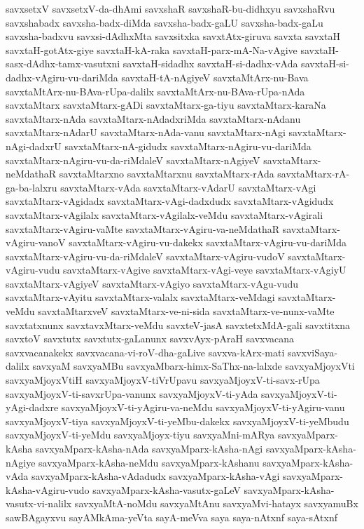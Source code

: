 {savxsetxV
savxsetxV-da-dhAmi
savxshaR
savxshaR-bu-didhxyu
savxshaRvu
savxshabadx
savxsha-badx-diMda
savxsha-badx-gaLU
savxsha-badx-gaLu
savxsha-badxvu
savxsi-dAdhxMta
savxsitxka
savxtAtx-giruva
savxta
savxtaH
savxtaH-gotAtx-giye
savxtaH-kA-raka
savxtaH-parx-mA-Na-vAgive
savxtaH-sasx-dAdhx-tamx-vasutxni
savxtaH-sidadhx
savxtaH-si-dadhx-vAda
savxtaH-si-dadhx-vAgiru-vu-dariMda
savxtaH-tA-nAgiyeV
savxtaMtArx-nu-Bava
savxtaMtArx-nu-BAva-rUpa-dalilx
savxtaMtArx-nu-BAva-rUpa-nAda
savxtaMtarx
savxtaMtarx-gADi
savxtaMtarx-ga-tiyu
savxtaMtarx-karaNa
savxtaMtarx-nAda
savxtaMtarx-nAdadxriMda
savxtaMtarx-nAdanu
savxtaMtarx-nAdarU
savxtaMtarx-nAda-vanu
savxtaMtarx-nAgi
savxtaMtarx-nAgi-dadxrU
savxtaMtarx-nA-gidudx
savxtaMtarx-nAgiru-vu-dariMda
savxtaMtarx-nAgiru-vu-da-riMdaleV
savxtaMtarx-nAgiyeV
savxtaMtarx-neMdathaR
savxtaMtarxno
savxtaMtarxnu
savxtaMtarx-rAda
savxtaMtarx-rA-ga-ba-lalxru
savxtaMtarx-vAda
savxtaMtarx-vAdarU
savxtaMtarx-vAgi
savxtaMtarx-vAgidadx
savxtaMtarx-vAgi-dadxdudx
savxtaMtarx-vAgidudx
savxtaMtarx-vAgilalx
savxtaMtarx-vAgilalx-veMdu
savxtaMtarx-vAgirali
savxtaMtarx-vAgiru-vaMte
savxtaMtarx-vAgiru-va-neMdathaR
savxtaMtarx-vAgiru-vanoV
savxtaMtarx-vAgiru-vu-dakekx
savxtaMtarx-vAgiru-vu-dariMda
savxtaMtarx-vAgiru-vu-da-riMdaleV
savxtaMtarx-vAgiru-vudoV
savxtaMtarx-vAgiru-vudu
savxtaMtarx-vAgive
savxtaMtarx-vAgi-veye
savxtaMtarx-vAgiyU
savxtaMtarx-vAgiyeV
savxtaMtarx-vAgiyo
savxtaMtarx-vAgu-vudu
savxtaMtarx-vAyitu
savxtaMtarx-valalx
savxtaMtarx-veMdagi
savxtaMtarx-veMdu
savxtaMtarxveV
savxtaMtarx-ve-ni-sida
savxtaMtarx-ve-nunx-vaMte
savxtatxnunx
savxtavxMtarx-veMdu
savxteV-jasA
savxtetxMdA-gali
savxtitxna
savxtoV
savxtutx
savxtutx-gaLanunx
savxvAyx-pAraH
savxvacana
savxvacanakekx
savxvacana-vi-roV-dha-gaLive
savxva-kArx-mati
savxviSaya-dalilx
savxyaM
savxyaMBu
savxyaMbarx-himx-SaThx-na-lalxde
savxyaMjoyxVti
savxyaMjoyxVtiH
savxyaMjoyxV-tiVrUpavu
savxyaMjoyxV-ti-savx-rUpa
savxyaMjoyxV-ti-savxrUpa-vanunx
savxyaMjoyxV-ti-yAda
savxyaMjoyxV-ti-yAgi-dadxre
savxyaMjoyxV-ti-yAgiru-va-neMdu
savxyaMjoyxV-ti-yAgiru-vanu
savxyaMjoyxV-tiya
savxyaMjoyxV-ti-yeMbu-dakekx
savxyaMjoyxV-ti-yeMbudu
savxyaMjoyxV-ti-yeMdu
savxyaMjoyx-tiyu
savxyaMni-mARya
savxyaMparx-kAsha
savxyaMparx-kAsha-nAda
savxyaMparx-kAsha-nAgi
savxyaMparx-kAsha-nAgiye
savxyaMparx-kAsha-neMdu
savxyaMparx-kAshanu
savxyaMparx-kAsha-vAda
savxyaMparx-kAsha-vAdadudx
savxyaMparx-kAsha-vAgi
savxyaMparx-kAsha-vAgiru-vudo
savxyaMparx-kAsha-vasutx-gaLeV
savxyaMparx-kAsha-vasutx-vi-nalilx
savxyaMtA-noMdu
savxyaMtAnu
savxyaMvi-hatayx
savxyamuBx
sawBAgayxvu
sayAMkAma-yeVta
sayA-meVva
saya
saya-nAtxnf
saya-sAtxnf
}
